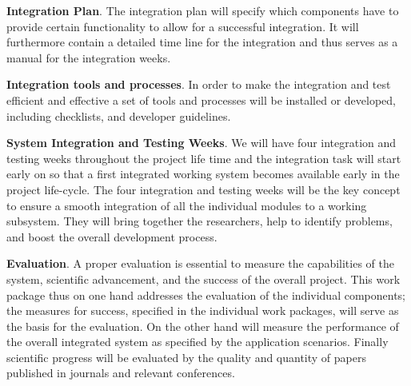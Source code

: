 \begin{denseItemize}
\item \textbf{Integration Plan}. The integration plan will specify which components have to provide certain functionality to allow for a successful integration. It will furthermore contain a detailed time line for the integration and thus serves as a manual for the integration weeks.
\item \textbf{Integration tools and processes}. In order to make the integration and test efficient and effective a set of tools and processes will be installed or developed, including checklists, and developer guidelines.
\item \textbf{System Integration and Testing Weeks}. We will have four integration and testing weeks throughout the project life time and the integration task will start early on so that a first integrated working system becomes available early in the project life-cycle. The four integration and testing weeks will be the key concept to ensure a smooth integration of all the individual modules to a working subsystem. They will bring together the researchers, help to identify problems, and boost the overall development process.
\item \textbf{Evaluation}. A proper evaluation is essential to measure the capabilities of the system, scientific advancement, and  the success of the overall project. This work package thus on one hand addresses the evaluation of the individual components; the measures for success, specified in the individual work packages, will serve as the basis for the evaluation. On the other hand \WPIntegration will measure the performance of the overall integrated system as specified by the application scenarios. Finally scientific progress will be evaluated by the quality and quantity of papers published in journals and relevant conferences. 
\end{denseItemize}


